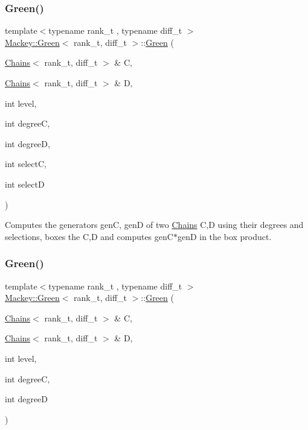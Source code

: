 \subsubsection{\texorpdfstring{Green()}{Green()}\hspace{0.1cm}{\footnotesize\ttfamily [1/2]}}
{\footnotesize\ttfamily template$<$typename rank\+\_\+t , typename diff\+\_\+t $>$ \\
\hyperlink{classMackey_1_1Green}{Mackey\+::\+Green}$<$ rank\+\_\+t, diff\+\_\+t $>$\+::\hyperlink{classMackey_1_1Green}{Green} (\begin{DoxyParamCaption}\item[{\hyperlink{classMackey_1_1Chains}{Chains}$<$ rank\+\_\+t, diff\+\_\+t $>$ \&}]{C,  }\item[{\hyperlink{classMackey_1_1Chains}{Chains}$<$ rank\+\_\+t, diff\+\_\+t $>$ \&}]{D,  }\item[{int}]{level,  }\item[{int}]{degreeC,  }\item[{int}]{degreeD,  }\item[{int}]{selectC,  }\item[{int}]{selectD }\end{DoxyParamCaption})}



Computes the generators genC, genD of two \hyperlink{classMackey_1_1Chains}{Chains} C,D using their degrees and selections, boxes the C,D and computes gen\+C$\ast$genD in the box product. 

\mbox{\label{classMackey_1_1Green_a5e51ae3cad1570c7a9bf2b395852982a}} 
\subsubsection{\texorpdfstring{Green()}{Green()}\hspace{0.1cm}{\footnotesize\ttfamily [2/2]}}
{\footnotesize\ttfamily template$<$typename rank\+\_\+t , typename diff\+\_\+t $>$ \\
\hyperlink{classMackey_1_1Green}{Mackey\+::\+Green}$<$ rank\+\_\+t, diff\+\_\+t $>$\+::\hyperlink{classMackey_1_1Green}{Green} (\begin{DoxyParamCaption}\item[{\hyperlink{classMackey_1_1Chains}{Chains}$<$ rank\+\_\+t, diff\+\_\+t $>$ \&}]{C,  }\item[{\hyperlink{classMackey_1_1Chains}{Chains}$<$ rank\+\_\+t, diff\+\_\+t $>$ \&}]{D,  }\item[{int}]{level,  }\item[{int}]{degreeC,  }\item[{int}]{degreeD }\end{DoxyParamCaption})}



